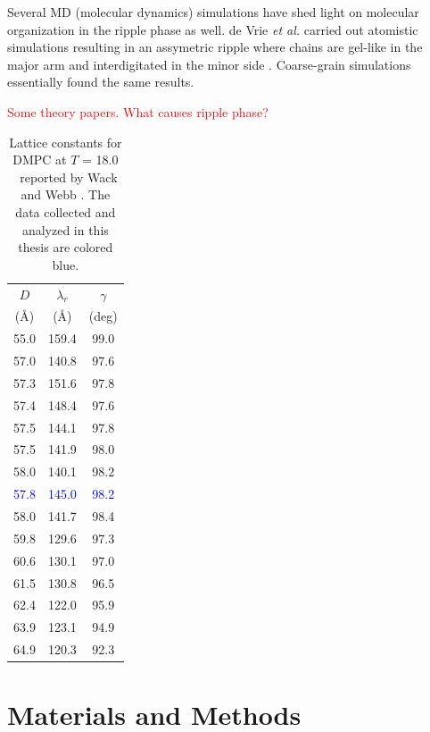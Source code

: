 Several MD (molecular dynamics) simulations have shed light on molecular 
organization in the ripple phase as well. 
de Vrie \textit{et al.} carried out atomistic simulations resulting in an
assymetric ripple where chains are gel-like in the major arm and
interdigitated in the minor side \cite{ref:deVries05}. Coarse-grain
simulations essentially found the same results.

\textcolor{red}{Some theory papers. What causes ripple phase?}

\begin{table}[htbp]
\centering
  \begin{tabular}{ccc}
    \hline
    $D$ & $\lambda_r$ & $\gamma$ \\
    (\AA) & (\AA) & (deg) \\
    \hline
    55.0 & 159.4 & 99.0 \\
    57.0 & 140.8 & 97.6 \\
    57.3 & 151.6 & 97.8 \\
    57.4 & 148.4 & 97.6 \\
    57.5	 & 144.1 & 97.8 \\
    57.5 & 141.9 & 98.0 \\
    58.0 & 140.1 & 98.2 \\
    \textcolor{blue}{57.8} & \textcolor{blue}{145.0} & \textcolor{blue}{98.2} \\
    58.0 & 141.7 & 98.4 \\
    59.8 & 129.6 & 97.3 \\
    60.6 & 130.1 & 97.0 \\
    61.5 & 130.8 & 96.5 \\
    62.4 & 122.0 & 95.9 \\
    63.9 & 123.1 & 94.9 \\
    64.9 & 120.3 & 92.3 \\    
    \hline 
  \end{tabular}
  \caption{Lattice constants for DMPC at $T$ = 18.0 \textcelsius\
  reported by Wack and Webb \cite{ref:Wack89}. The data collected and analyzed in this thesis
  are colored blue.} 
\end{table}

\newpage
\section{Materials and Methods}

